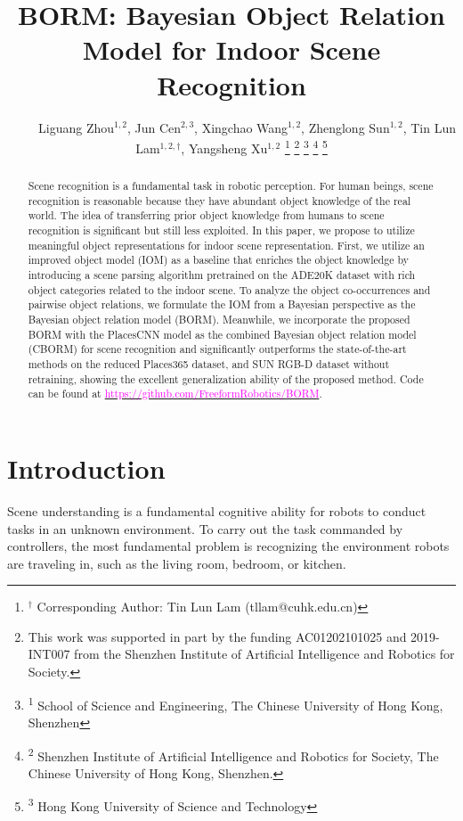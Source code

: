 \documentclass[letterpaper, 10 pt, conference]{ieeeconf}  %
\title{\LARGE \bf
BORM: Bayesian Object Relation Model for Indoor Scene Recognition  
}
\author{~~~~~{Liguang Zhou$^{1,2}$, Jun Cen$^{2,3}$, Xingchao Wang$^{1,2}$, Zhenglong Sun$^{1,2}$, Tin Lun Lam$^{1,2,\dagger}$, Yangsheng Xu$^{1,2}$}
\thanks{$^{\dagger}$ Corresponding Author: Tin Lun Lam (tllam@cuhk.edu.cn)}
\thanks{This work was supported in part by the funding AC01202101025 and 2019-INT007 from the Shenzhen Institute of Artificial Intelligence and Robotics for Society.}
\thanks{\textsuperscript{1} School of Science and Engineering, The Chinese University of Hong Kong, Shenzhen}
\thanks{\textsuperscript{2}  Shenzhen Institute of Artificial Intelligence and Robotics for Society, The Chinese University of Hong Kong, Shenzhen.}
\thanks{\textsuperscript{3} Hong Kong University of Science and Technology}
}
\begin{document}
\maketitle
\thispagestyle{empty}
\pagestyle{empty}


\begin{abstract}
Scene recognition is a fundamental task in robotic perception. For human beings, scene recognition is reasonable because they have abundant object knowledge of the real world. The idea of transferring prior object knowledge from humans to scene recognition is significant but still less exploited. 
In this paper, we propose to utilize meaningful object representations for indoor scene representation. First, we utilize an improved object model (IOM) as a baseline that enriches the object knowledge by introducing a scene parsing algorithm pretrained on the ADE20K dataset with rich object categories related to the indoor scene. To analyze the object co-occurrences and pairwise object relations, we formulate the IOM from a Bayesian perspective as the Bayesian object relation model (BORM). Meanwhile, we incorporate the proposed BORM with the PlacesCNN model as the combined Bayesian object relation model (CBORM) for scene recognition and significantly outperforms the state-of-the-art methods on the reduced Places365 dataset, and SUN RGB-D dataset without retraining, showing the excellent generalization ability of the proposed method. Code can be found at \href{https://github.com/hszhoushen/borm}{\textcolor{magenta}{https://github.com/FreeformRobotics/BORM}}.
\end{abstract}




\section{Introduction}
\label{sec:intro}


Scene understanding is a fundamental cognitive ability for robots to conduct tasks in an unknown environment. To carry out the task commanded by controllers, the most fundamental problem is recognizing the environment robots are traveling in, such as the living room, bedroom, or kitchen.
\end{document}
